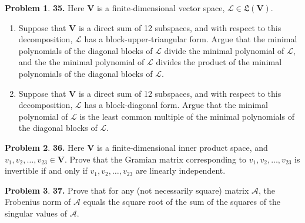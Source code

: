 \documentclass{article}
\theoremstyle{definition}
\newtheorem*{prob*}{Problem}
\newcommand{\V}{\mathbf{V}}
\newcommand{\A}{\mathcal{A}}
\newcommand{\lag}{\mathcal{L}}
\newcommand{\LL}{\mathfrak{L}}
\begin{document}
\newpage










\begin{prob*}\textbf{35.} Here $\V$ is a finite-dimensional vector space, $\lag \in \LL(\V)$. 
	
	\begin{enumerate}
		\item Suppose that $\V$ is a direct sum of 12 subspaces, and with respect to this decomposition, $\lag$ has a block-upper-triangular form. Argue that the minimal polynomials of the diagonal blocks of $\lag$ divide the minimal polynomial of $\lag$, and the the minimal polynomial of $\lag$ divides the product of the minimal polynomials of the diagonal blocks of $\lag$.
		
		\item Suppose that $\V$ is a direct sum of 12 subspaces, and with respect to this decomposition, $\lag$ has a block-diagonal form. Argue that the minimal polynomial of $\lag$ is the least common multiple of the minimal polynomials of the diagonal blocks of $\lag$. 
	\end{enumerate}
	
\end{prob*}




\newpage





\begin{prob*}\textbf{36.} Here $\V$ is a finite-dimensional inner product space, and $v_1, v_2, \dots, v_23 \in \V$. Prove that the Gramian matrix corresponding to $v_1, v_2, \dots ,v_{23}$ is invertible if and only if $v_1, v_2, \dots, v_{23}$ are linearly independent. 
	
\end{prob*}




\newpage





\begin{prob*}\textbf{37.} Prove that for any (not necessarily square) matrix $\A$, the Frobenius norm of $\A$ equals the square root of the sum of the squares of the singular values of $\A$.
	
\end{prob*}
\end{document}
